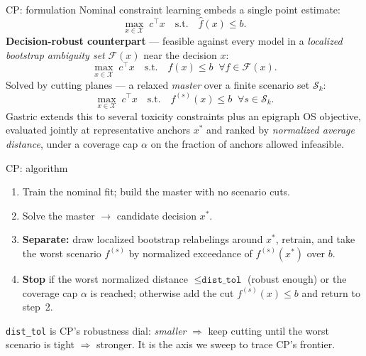 \documentclass{beamer}
\begin{document}
\begin{frame}{CP: formulation}
  Nominal constraint learning embeds a single point estimate:
  \[
    \max_{x\in\mathcal{X}}\; c^\top x
    \quad\text{s.t.}\quad \hat f(x)\le b .
  \]
  \textbf{Decision-robust counterpart} --- feasible against every model in a
  \emph{localized bootstrap ambiguity set} $\mathcal{F}(x)$ near the decision $x$:
  \[
    \max_{x\in\mathcal{X}}\; c^\top x
    \quad\text{s.t.}\quad f(x)\le b \;\;\forall f\in\mathcal{F}(x) .
  \]
  Solved by cutting planes --- a relaxed \emph{master} over a finite scenario set $\mathcal{S}_k$:
  \[
    \max_{x\in\mathcal{X}}\; c^\top x
    \quad\text{s.t.}\quad f^{(s)}(x)\le b \;\;\forall s\in\mathcal{S}_k .
  \]
  \small
  Gastric extends this to several toxicity constraints plus an epigraph OS objective, evaluated
  jointly at representative anchors $x^\ast$ and ranked by \emph{normalized average distance},
  under a coverage cap $\alpha$ on the fraction of anchors allowed infeasible.
\end{frame}

\begin{frame}{CP: algorithm}
  \begin{enumerate}
  \item Train the nominal fit; build the master with no scenario cuts.
  \item Solve the master $\rightarrow$ candidate decision $x^\ast$.
  \item \textbf{Separate:} draw localized bootstrap relabelings around $x^\ast$, retrain, and take the
    worst scenario $f^{(s)}$ by normalized exceedance of $f^{(s)}(x^\ast)$ over $b$.
  \item \textbf{Stop} if the worst normalized distance $\le\texttt{dist\_tol}$ (robust enough) or the
    coverage cap $\alpha$ is reached; otherwise add the cut $f^{(s)}(x)\le b$ and return to step~2.
  \end{enumerate}
  \vspace{0.5em}
  \small
  \texttt{dist\_tol} is CP's robustness dial: \emph{smaller} $\Rightarrow$ keep cutting until the worst
  scenario is tight $\Rightarrow$ stronger. It is the axis we sweep to trace CP's frontier.
\end{frame}
\end{document}
